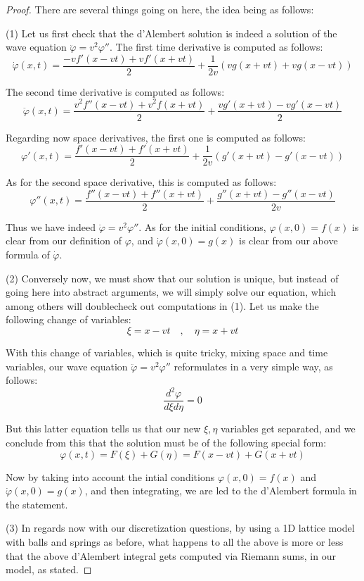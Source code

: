 \documentclass[12pt]{amsbook}
\begin{document}
\begin{proof}
There are several things going on here, the idea being as follows:

\medskip

(1) Let us first check that the d'Alembert solution is indeed a solution of the wave equation $\ddot{\varphi}=v^2\varphi''$. The first time derivative is computed as follows:
$$\dot{\varphi}(x,t)=\frac{-vf'(x-vt)+vf'(x+vt)}{2}+\frac{1}{2v}(vg(x+vt)+vg(x-vt))$$

The second time derivative is computed as follows:
$$\ddot{\varphi}(x,t)=\frac{v^2f''(x-vt)+v^2f(x+vt)}{2}+\frac{vg'(x+vt)-vg'(x-vt)}{2}$$

Regarding now space derivatives, the first one is computed as follows:
$$\varphi'(x,t)=\frac{f'(x-vt)+f'(x+vt)}{2}+\frac{1}{2v}(g'(x+vt)-g'(x-vt))$$

As for the second space derivative, this is computed as follows:
$$\varphi''(x,t)=\frac{f''(x-vt)+f''(x+vt)}{2}+\frac{g''(x+vt)-g''(x-vt)}{2v}$$

Thus we have indeed $\ddot{\varphi}=v^2\varphi''$. As for the initial conditions, $\varphi(x,0)=f(x)$ is clear from our definition of $\varphi$, and $\dot{\varphi}(x,0)=g(x)$ is clear from our above formula of $\dot{\varphi}$.

\medskip

(2) Conversely now, we must show that our solution is unique, but instead of going here into abstract arguments, we will simply solve our equation, which among others will doublecheck out computations in (1). Let us make the following change of variables:
$$\xi=x-vt\quad,\quad\eta=x+vt$$

With this change of variables, which is quite tricky, mixing space and time variables, our wave equation $\ddot{\varphi}=v^2\varphi''$ reformulates in a very simple way, as follows:
$$\frac{d^2\varphi}{d\xi d\eta}=0$$

But this latter equation tells us that our new $\xi,\eta$ variables get separated, and we conclude from this that the solution must be of the following special form:
$$\varphi(x,t)=F(\xi)+G(\eta)=F(x-vt)+G(x+vt)$$

Now by taking into account the intial conditions $\varphi(x,0)=f(x)$ and $\dot{\varphi}(x,0)=g(x)$, and then integrating, we are led to the d'Alembert formula in the statement.

\medskip

(3) In regards now with our discretization questions, by using a 1D lattice model with balls and springs as before, what happens to all the above is more or less that the above d'Alembert integral gets computed via Riemann sums, in our model, as stated.
\end{proof}
\end{document}
